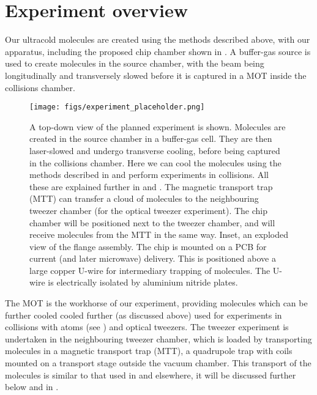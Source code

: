\section{Experiment overview}
\label{overview:overview}

Our ultracold molecules are created using the methods described above, with our
apparatus, including the proposed chip chamber shown in
. A buffer-gas source is used to create
\CaF{} molecules in the source chamber, with the beam being longitudinally and
transversely slowed before it is captured in a MOT inside the collisions
chamber.

\begin{figure}[htb]
  \centering
  \texttt{[image: figs/experiment\_placeholder.png]}
  \caption{
    A top-down view of the planned \CaF{} experiment is shown. Molecules are
    created in the source chamber in a buffer-gas cell. They are then
    laser-slowed  and undergo transverse
    cooling, before being captured in the collisions chamber.
    Here we can cool the
    molecules using the methods described in and perform
    experiments in collisions. All these are explained further in  and . The magnetic transport
    trap (MTT) can transfer a cloud of molecules to the neighbouring tweezer
    chamber (for the optical tweezer experiment). The chip chamber will be
    positioned next to the tweezer chamber, and will receive molecules from the
    MTT in the same way. Inset, an exploded view of the flange assembly. The
    chip is mounted on a PCB for current (and later microwave) delivery. This
    is positioned above a large copper U-wire for intermediary trapping of
    molecules. The U-wire is electrically isolated by aluminium nitride
    plates.}
  \label{overview:fig:vacuumsystem}
\end{figure}

The \CaF{} MOT is the workhorse of our experiment, providing molecules which
can be further cooled cooled further (as discussed above) used for experiments
in collisions with \Rb{} atoms (see ) and optical tweezers. The tweezer experiment is
undertaken in the neighbouring tweezer chamber, which is loaded by transporting
molecules in a magnetic transport trap (MTT), a quadrupole trap with coils
mounted on a transport stage outside the vacuum chamber. This transport of the
molecules is similar to that used in
 and elsewhere, it will be
discussed further below and in .

